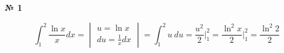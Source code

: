 \documentclass{article}
\begin{document}
\textbf{№ 1} 

$$ \int_{1}^{2} \frac{\ln{x}}{x}dx 
 = \begin{vmatrix}  u  = \ln{x} \\ 
                    du = \frac{1}{x} dx \end{vmatrix}
= \int_{1}^{2} u \ du
= \frac{u^2}{2} \bigg\vert_{1}^{2}
= \frac{\ln^2{x}}{2} \bigg\vert_{1}^{2} 
= \frac{\ln^2{2}}{2} $$
\end{document}
